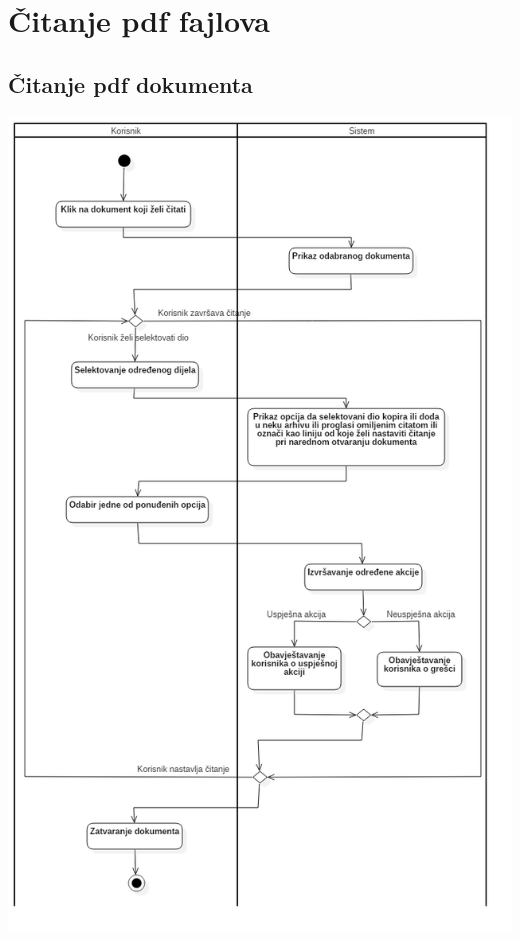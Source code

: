 \section{Čitanje pdf fajlova}

\subsection{Čitanje pdf dokumenta}

\begin{center}
    \includegraphics[scale=0.4]{images/CitanjePdfDokumenta.png}
\end{center}

